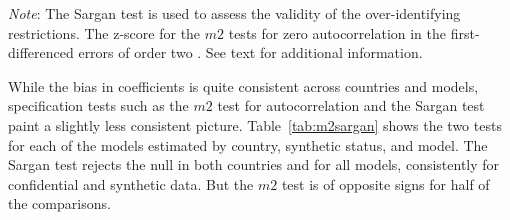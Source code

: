 \documentclass[10pt,twoside]{article}
\begin{document}
\begin{table}[!htbp] \centering 
  \caption{m2 and Sargan tests by country} 
  \label{tab:m2sargan} 
\begin{tablenotes}\footnotesize \item 
\textit{Note}: The Sargan test \parencite{blundell_estimation_2001,RePEc:oup:restud:v:58:y:1991:i:2:p:277-297.} is used to assess the validity of the over-identifying restrictions. The z-score for the $m2$ tests for zero autocorrelation in the  first-differenced errors of order two \parencite{RePEc:oup:restud:v:58:y:1991:i:2:p:277-297.}. See text for additional information.
\end{tablenotes}

\end{table} 
 

While the bias in coefficients is quite consistent across countries and models, specification tests such as  the $m2$ test for autocorrelation and the Sargan test paint a slightly less consistent picture. Table~\ref{tab:m2sargan} shows the two tests for each of the models estimated by country, synthetic status, and model. The Sargan test rejects the null in both countries and for all models, consistently for confidential and synthetic data. But the $m2$ test is of opposite signs for half of the comparisons. 
\end{document}
